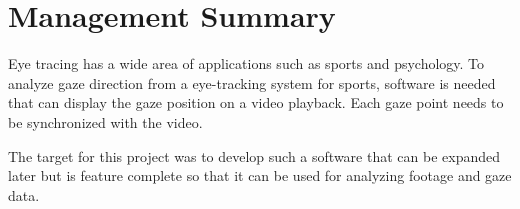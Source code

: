 \chapter*{Management Summary}
\label{chap:managementSummary}

Eye tracing has a wide area of applications such as sports and psychology. To analyze gaze direction from a eye-tracking system for sports, software is needed that can display the gaze position on a video playback. Each gaze point needs to be synchronized with the video. 

The target for this project was to develop such a software that can be expanded later but is feature complete so that it can be used for analyzing footage and gaze data.
